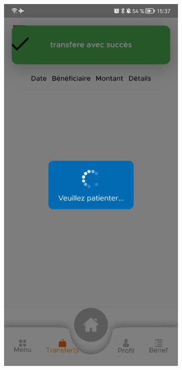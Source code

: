 \begin{itemize}[label=$\ast$]
\begin{figure}
	\centering
	\begin{subfigure}[b]{0.3\textwidth}
		\centering
		\includegraphics[width=\textwidth]{./Template LaTeX/Images/16.jpg}

\end{subfigure}
\end{figure}
\end{itemize}
